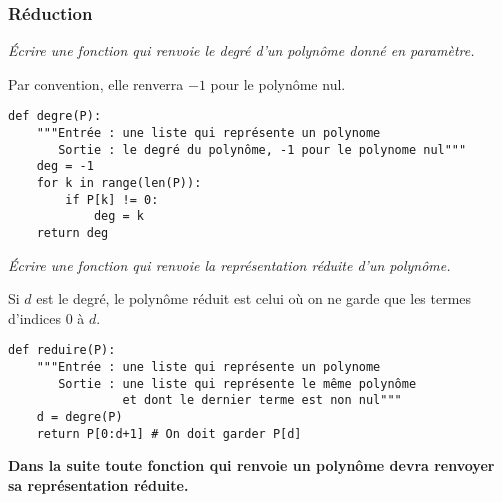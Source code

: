 \subsubsection{Réduction}
\begin{Exercise}[title=Degré]\it
Écrire une fonction  qui renvoie le degré d'un polynôme donné en paramètre. 

Par convention, elle renverra $-1$ pour le polynôme nul.
\end{Exercise} 
\begin{Answer}
\begin{lstlisting}
def degre(P):
    """Entrée : une liste qui représente un polynome
       Sortie : le degré du polynôme, -1 pour le polynome nul"""
    deg = -1
    for k in range(len(P)):
        if P[k] != 0:
            deg = k
    return deg
\end{lstlisting}
\end{Answer}  
\begin{Exercise}[title=Réduction]\it  
Écrire une fonction  qui renvoie la représentation réduite d'un polynôme. 
\end{Exercise}
\begin{Answer}Si $d$ est le degré, le polynôme réduit est celui où on ne garde que les termes d'indices 0 à $d$.
\begin{lstlisting}
def reduire(P):
    """Entrée : une liste qui représente un polynome
       Sortie : une liste qui représente le même polynôme 
                et dont le dernier terme est non nul"""
    d = degre(P)
    return P[0:d+1] # On doit garder P[d]
\end{lstlisting}
\end{Answer}
\medskip

{\bf Dans la suite toute fonction qui renvoie un polynôme devra renvoyer sa représentation réduite.}
